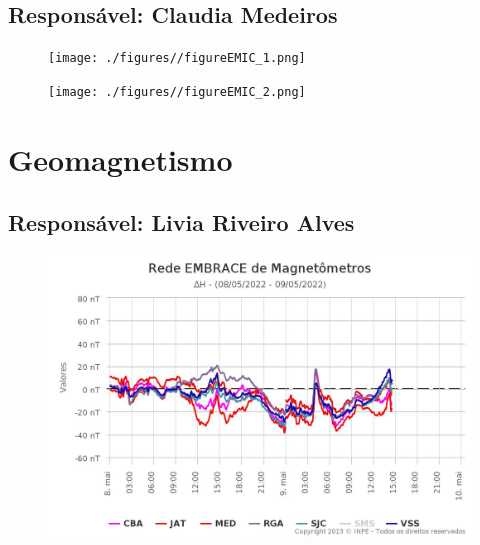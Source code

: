 \documentclass[a4paper, 10pt]{article}
\begin{document}
 \subsection{Responsável: Claudia Medeiros} 
 
\begin{figure}[H]
    
                        \centering
   
                             \texttt{[image: ./figures//figureEMIC\_1.png]}

                        \end{figure}

                     \begin{figure}[H]
    
                        \centering
   
                             \texttt{[image: ./figures//figureEMIC\_2.png]}

                        \end{figure}

                     \section{Geomagnetismo} 
 \subsection{Responsável: Livia Riveiro Alves} 
 
\begin{figure}[H]
    
                        \centering
   
                             \includegraphics[width=14cm]{./figures//figureGeomag_0.png}

                        \end{figure}
\end{document}
